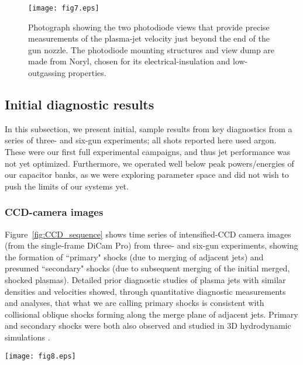 \documentclass[journal]{IEEEtran}
\begin{document}
\begin{figure}[!tb]
\centering
\texttt{[image: fig7.eps]}
\caption{Photograph showing the two photodiode views
that provide precise measurements of the plasma-jet velocity just beyond
the end of the gun nozzle.  The photodiode mounting structures
and view dump are made from Noryl, chosen for its electrical-insulation and low-outgassing
properties.}
\label{fig:PD_setup}
\end{figure}

\subsection{Initial diagnostic results}
\label{sec:results}

In this subsection, we present initial, sample results from key diagnostics from a series
of three- and six-gun experiments; all shots reported here used argon.
These were our first full experimental campaigns,
and thus jet performance was not yet optimized.  Furthermore,
we operated well below peak powers/energies of our capacitor banks, as we were exploring
parameter space and did not wish to push the limits of our systems yet.

\subsubsection{CCD-camera images}
Figure~\ref{fig:CCD_sequence} shows time 
series of intensified-CCD camera images (from the single-frame DiCam Pro)
from three- and six-gun experiments, showing the formation of ``primary" shocks 
(due to merging of adjacent jets)
and presumed ``secondary" shocks
(due to subsequent merging of the initial merged, shocked plasmas).
Detailed prior diagnostic studies \cite{merritt13,merritt14}  of plasma jets with similar densities and
velocities showed,
through quantitative diagnostic measurements and analyses, that what we are calling
primary shocks is consistent with collisional oblique shocks forming along the merge plane
of adjacent jets.  Primary and secondary shocks were both also observed and
studied in 3D hydrodynamic simulations \cite{kim13}.

\begin{figure*}[!t]
\centering
\texttt{[image: fig8.eps]}
\caption{Intensified-CCD camera images (10-ns exposure, logarithm of intensity,
false color, cropped to $1280\times 850$~pixels each) showing the evolution of
(a)--(d)~3-gun (shots 1064, 1066, 1061, 1069) and (e)--(h)~6-gun experiments
(shots 1007, 1038, 1041, 1043).  As labelled in the 3-gun image sequence,
primary shocks (b) form along the merge plane of
adjacent jets, and (presumed)
secondary shocks (d) form due to subsequent merging of the primary-shock plasmas.}
\label{fig:CCD_sequence}
\end{figure*}
\end{document}
